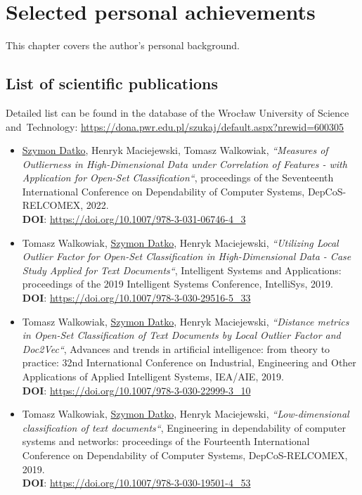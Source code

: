 \chapter{Selected personal achievements}
\label{chapter:achievements}

This chapter covers the author's personal background.


\section{List of scientific publications}
\label{section:publications}

Detailed list can be found in the database of the Wrocław University of Science and~Technology: \url{https://dona.pwr.edu.pl/szukaj/default.aspx?nrewid=600305}

\begin{itemize}
    \item
        \underline{Szymon Datko}, Henryk Maciejewski, Tomasz Walkowiak,
        \textit{“Measures of Outlierness in High-Dimensional Data under Correlation of Features - with Application for Open-Set Classification“},
        proceedings of the Seventeenth International Conference on Dependability of Computer Systems, DepCoS-RELCOMEX, 2022.\\
        \textbf{DOI}: \url{https://doi.org/10.1007/978-3-031-06746-4_3}

    \item
        Tomasz Walkowiak, \underline{Szymon Datko}, Henryk Maciejewski,
        \textit{“Utilizing Local Outlier Factor for Open-Set Classification in High-Dimensional Data - Case Study Applied for Text Documents“},
        Intelligent Systems and Applications: proceedings of the 2019 Intelligent Systems Conference, IntelliSys, 2019.\\
        \textbf{DOI}: \url{https://doi.org/10.1007/978-3-030-29516-5_33}

    \item
        Tomasz Walkowiak, \underline{Szymon Datko}, Henryk Maciejewski,
        \textit{“Distance metrics in Open-Set Classification of Text Documents by Local Outlier Factor and Doc2Vec“},
        Advances and trends in artificial intelligence: from theory to practice: 32nd International Conference on Industrial, Engineering and Other Applications of Applied Intelligent Systems, IEA/AIE, 2019.\\
        \textbf{DOI}: \url{https://doi.org/10.1007/978-3-030-22999-3_10}

    \item
        Tomasz Walkowiak, \underline{Szymon Datko}, Henryk Maciejewski,
        \textit{“Low-dimensional classification of text documents“},
        Engineering in dependability of computer systems and networks: proceedings of the Fourteenth International Conference on Dependability of Computer Systems, DepCoS-RELCOMEX, 2019.\\
        \textbf{DOI}: \url{https://doi.org/10.1007/978-3-030-19501-4_53}


\end{itemize}

